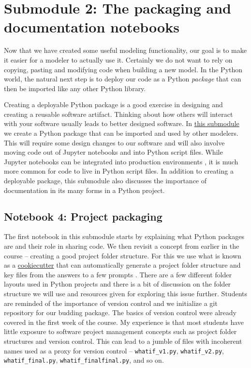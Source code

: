 \documentclass[ited,blindrev]{informs3}              %
\newcommand{\code}[1]{\texttt{#1}}
\begin{document}
\section{Submodule 2: The packaging and documentation notebooks}

Now that we have created some useful modeling functionality, our goal is to make it easier for a modeler to actually use it. Certainly we do not want to rely on copying, pasting and modifying code when building a new model. In the Python world, the natural next step is to deploy our code as a Python \textit{package} \cite{buezentomasWelcomePythonPackages} that can then be imported like any other Python library.

Creating a deployable Python package is a good exercise in designing and creating a reusable software artifact. Thinking about how others will interact with your software usually leads to better designed software.  In \href{http://www.sba.oakland.edu/faculty/isken/courses/mis6900/mod3b_whatif_packaging.html}{this submodule} we create a Python package that can be imported and used by other modelers. This will require some design changes to our software and will also involve moving code out of Jupyter notebooks and into Python script files. While Jupyter notebooks can be integrated into production environments \cite{uffordInteractiveNotebookInnovation2019}, it is much more common for code to live in Python script files. In addition to creating a deployable package, this submodule also discusses the importance of documentation in its many forms in a Python project.

\subsection{Notebook 4: Project packaging}

The first notebook in this submodule starts by explaining what Python packages are and their role in sharing code. We then revisit a concept from earlier in the course -- creating a good project folder structure. For this we use what is known as a \href{https://cookiecutter.readthedocs.io/en/stable/}{cookiecutter} that can automatically generate a project folder structure and key files from the answers to a few prompts \cite{CookiecutterBetterProject}. There are a few different folder layouts used in Python projects and there is a bit of discussion on the folder structure we will use and resources given for exploring this issue further. Students are reminded of the importance of version control and we initialize a git repository for our budding package. The basics of version control were already covered in the first week of the course. My experience is that most students have little exposure to software project management concepts such as project folder structures and version control. This can lead to a jumble of files with incoherent names used as a proxy for version control -- \code{whatif\_v1.py}, \code{whatif\_v2.py}, \code{whatif\_final.py}, \code{whatif\_finalfinal.py}, and so on.
\end{document}
